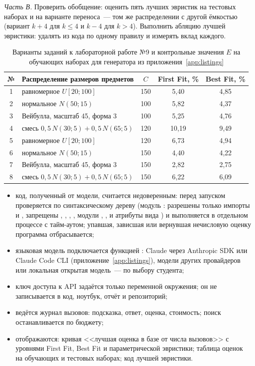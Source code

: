 \emph{Часть В.} Проверить обобщение: оценить пять лучших эвристик на тестовых наборах и на варианте
переноса~--- том же распределении с другой ёмкостью (вариант $k + 4$ для $k \le 4$ и $k - 4$ для $k > 4$).
Выполнить абляцию лучшей эвристики: удалять из кода по одному правилу и измерять вклад каждого.

\begin{table}[!htb]
\caption{Варианты заданий к лабораторной работе №9 и контрольные значения $E$ на обучающих наборах для
генератора из приложения~\ref{app:listings}}
\label{tab:l9-var}
\centering\small
\begin{tabular}{clccc}
\toprule
№ & Распределение размеров предметов & $C$ & First Fit, \% & Best Fit, \% \\
\midrule
1 & равномерное $U[20; 100]$                      & 150 & 5,40  & 4,85 \\
2 & нормальное $N(50; 15)$                         & 100 & 5,82  & 4,37 \\
3 & Вейбулла, масштаб 45, форма 3                   & 100 & 5,25  & 4,76 \\
4 & смесь $0,5\,N(30; 5) + 0,5\,N(65; 5)$           & 120 & 10,19 & 9,49 \\
5 & равномерное $U[20; 100]$                       & 120 & 6,73  & 4,94 \\
6 & нормальное $N(50; 15)$                         & 150 & 4,40  & 4,22 \\
7 & Вейбулла, масштаб 45, форма 3                   & 150 & 2,82  & 2,75 \\
8 & смесь $0,5\,N(30; 5) + 0,5\,N(65; 5)$           & 150 & 6,22  & 6,09 \\
\bottomrule
\end{tabular}
\end{table}

\begin{itemize}
\item код, полученный от модели, считается недоверенным: перед запуском проверяется по синтаксическому
дереву (модуль : разрешены только импорты  и , запрещены ,
, , , модули , ,  и атрибуты
вида ) и выполняется в отдельном процессе с тайм-аутом; упавшая, зависшая или вернувшая
нечисловую оценку программа отбрасывается;
\item языковая модель подключается функцией : Claude через
Anthropic SDK или Claude Code CLI (приложение~\ref{app:listings}), модели других провайдеров или локальная
открытая модель~--- по выбору студента;
\item ключ доступа к API задаётся только переменной окружения; он не записывается в код, ноутбук,
отчёт и репозиторий;
\item ведётся журнал вызовов: подсказка, ответ, оценка, стоимость; поиск останавливается по бюджету;
\item отображаются: кривая <<лучшая оценка в базе от числа вызовов>> с уровнями First Fit, Best Fit и
параметрической эвристики; таблица оценок на обучающих и тестовых наборах; код лучшей эвристики.
\end{itemize}

